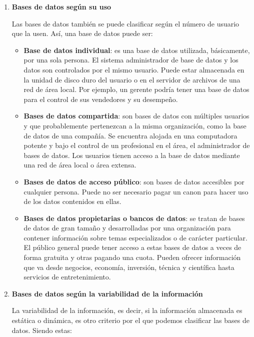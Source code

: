 \begin{enumerate}[label=(\alph*)]
    \item \textbf{Bases de datos según su uso}

    Las bases de datos también se puede clasificar según el número de usuario que la usen. Así, una base de datos puede ser:

    \begin{itemize}
        \item \textbf{Base de datos individual}: es una base de datos utilizada, básicamente, por una sola persona. El sistema administrador de base de datos y los datos son controlados por el mismo usuario. Puede estar almacenada en la unidad de disco duro del usuario o en el servidor de archivos de una red de área local. Por ejemplo, un gerente podría tener una base de datos para el control de sus vendedores y su desempeño.

        \item \textbf{Bases de datos compartida}: son bases de datos con múltiples usuarios y que probablemente pertenezcan a la misma organización, como la base de datos de una compañía. Se encuentra alojada en una computadora potente y bajo el control de un profesional en el área, el administrador de bases de datos. Los usuarios tienen acceso a la base de datos mediante una red de área local o área extensa.

        \item \textbf{Bases de datos de acceso público}: son bases de datos accesibles por cualquier persona. Puede no ser necesario pagar un canon para hacer uso de los datos contenidos en ellas.

        \item \textbf{Bases de datos propietarias o bancos de datos}: se tratan de bases de datos de gran tamaño y desarrolladas por una organización para contener información sobre temas especializados o de carácter particular. El público general puede tener acceso a estas bases de datos a veces de forma gratuita y otras pagando una cuota. Pueden ofrecer información que va desde negocios, economía, inversión, técnica y científica hasta servicios de entretenimiento.
    \end{itemize}

    \item \textbf{Bases de datos según la variabilidad de la información}

    La variabilidad de la información, es decir, si la información almacenada es estática o dinámica, es otro criterio por el que podemos clasificar las bases de datos. Siendo estas:


\end{enumerate}
